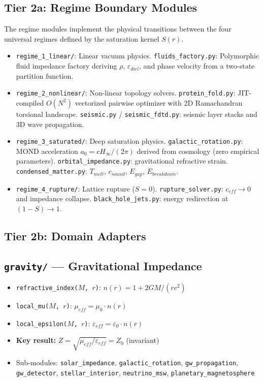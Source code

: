 \subsection{Tier 2a: Regime Boundary Modules}

The regime modules implement the physical transitions between the four
universal regimes defined by the saturation kernel $S(r)$.

\begin{itemize}
    \item \texttt{regime\_1\_linear/}: Linear vacuum physics.
          \texttt{fluids\_factory.py}: Polymorphic fluid impedance
          factory deriving $\rho$, $\varepsilon_{diel}$, and phase velocity
          from a two-state partition function.
    \item \texttt{regime\_2\_nonlinear/}: Non-linear topology solvers.
          \texttt{protein\_fold.py}: JIT-compiled $O(N^2)$ vectorized
          pairwise optimizer with 2D Ramachandran torsional landscape.
          \texttt{seismic.py} / \texttt{seismic\_fdtd.py}: seismic layer
          stacks and 3D wave propagation.
    \item \texttt{regime\_3\_saturated/}: Deep saturation physics.
          \texttt{galactic\_rotation.py}: MOND acceleration $a_0 = cH_\infty/(2\pi)$
          derived from cosmology (zero empirical parameters).
          \texttt{orbital\_impedance.py}: gravitational refractive strain.
          \texttt{condensed\_matter.py}: $T_{melt}$, $c_{sound}$, $E_{gap}$,
          $E_{breakdown}$.
    \item \texttt{regime\_4\_rupture/}: Lattice rupture ($S = 0$).
          \texttt{rupture\_solver.py}: $c_{eff} \to 0$ and impedance collapse.
          \texttt{black\_hole\_jets.py}: energy redirection at $(1-S) \to 1$.
\end{itemize}

\subsection{Tier 2b: Domain Adapters}

\subsection{\texttt{gravity/} --- Gravitational Impedance}

\begin{itemize}
    \item \texttt{refractive\_index($M$, $r$)}: $n(r) = 1 + 2GM/(rc^2)$
    \item \texttt{local\_mu($M$, $r$)}: $\mu_{eff} = \mu_0 \cdot n(r)$
    \item \texttt{local\_epsilon($M$, $r$)}: $\varepsilon_{eff} = \varepsilon_0 \cdot n(r)$
    \item \textbf{Key result:} $Z = \sqrt{\mu_{eff}/\varepsilon_{eff}} = Z_0$ (invariant)
    \item Sub-modules: \texttt{solar\_impedance}, \texttt{galactic\_rotation},
          \texttt{gw\_propagation}, \texttt{gw\_detector},
          \texttt{stellar\_interior},
          \texttt{neutrino\_msw}, \texttt{planetary\_magnetosphere}
\end{itemize}

